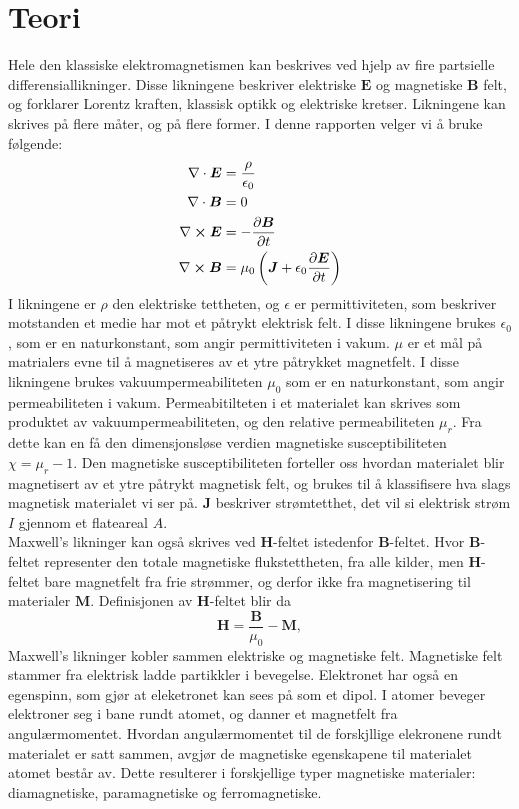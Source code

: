 \documentclass[%
 reprint,
 amsmath,amssymb,
 aps,
 norsk,
]{revtex4-1}
\begin{document}
\section{\label{sec:level2}Teori}
Hele den klassiske elektromagnetismen kan beskrives ved hjelp av fire partsielle differensiallikninger. Disse likningene beskriver elektriske $\bm{E}$ og magnetiske $\bm{B}$ felt, og forklarer Lorentz kraften, klassisk optikk og elektriske kretser. Likningene kan skrives på flere måter, og på flere former. I denne rapporten velger vi å bruke følgende:
\begin{align}
  \nabla \cdot \bm{E} &= \frac{\rho}{\epsilon_0} \label{1}\\
  \nabla \cdot \bm{B} &= 0 \label{2}\\
  \nabla \cross \bm{E} &= -\pdv{\bm{B}}{t} \label{3}\\
  \nabla \cross \bm{B} &= \mu_0\left(\bm{J} + \epsilon_0\pdv{\bm{E}}{t}\right) \label{4}
\end{align}
I likningene er $\rho$ den elektriske tettheten, og $\epsilon$ er permittiviteten, som beskriver motstanden et medie har mot et påtrykt elektrisk felt. I disse likningene brukes $\epsilon_0$, som er en naturkonstant, som angir permittiviteten i vakum. $\mu$ er et mål på matrialers evne til å magnetiseres av et ytre påtrykket magnetfelt. I disse likningene brukes vakuumpermeabiliteten $\mu_0$ som er en naturkonstant, som angir permeabiliteten i vakum. Permeabitilteten i et materialet kan skrives som produktet av vakuumpermeabiliteten, og den relative permeabiliteten $\mu_r$. Fra dette kan en få den dimensjonsløse verdien magnetiske susceptibiliteten $\chi = \mu_r - 1$. Den magnetiske susceptibiliteten forteller oss hvordan materialet blir magnetisert av et ytre påtrykt magnetisk felt, og brukes til å klassifisere hva slags magnetisk materialet vi ser på. $\bm{J}$ beskriver strømtetthet, det vil si elektrisk strøm $I$ gjennom et flateareal $A$. \\
Maxwell's likninger kan også skrives ved $\bm{H}$-feltet istedenfor $\bm{B}$-feltet. Hvor $\bm{B}$-feltet representer den totale magnetiske flukstettheten, fra alle kilder, men $\bm{H}$-feltet bare magnetfelt fra frie strømmer, og derfor ikke fra magnetisering til materialer $\bm{M}$. Definisjonen av $\bm{H}$-feltet blir da
\begin{equation}
  \bm{H} = \frac{\bm{B}}{\mu_0}-\bm{M}, \label{get_H}
\end{equation}
Maxwell's likninger kobler sammen elektriske og magnetiske felt. Magnetiske felt stammer fra elektrisk ladde partikkler i bevegelse. Elektronet har også en egenspinn, som gjør at eleketronet kan sees på som et dipol. I atomer beveger elektroner seg i bane rundt atomet, og danner et magnetfelt fra angulærmomentet. Hvordan angulærmomentet til de forskjllige elekronene rundt materialet er satt sammen, avgjør de magnetiske egenskapene til materialet atomet består av. Dette resulterer i forskjellige typer magnetiske materialer: diamagnetiske, paramagnetiske og ferromagnetiske.
\end{document}
